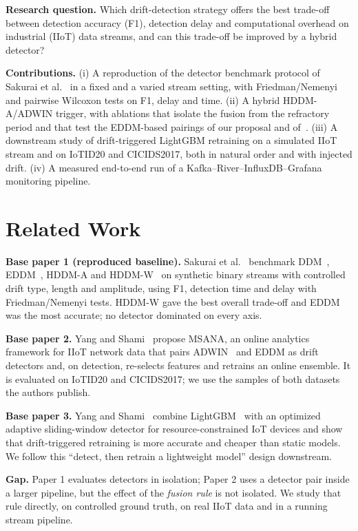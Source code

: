 \documentclass[conference]{IEEEtran}
\begin{document}
\textbf{Research question.} Which drift-detection strategy offers the best trade-off between detection accuracy (F1), detection delay and computational overhead on industrial (IIoT) data streams, and can this trade-off be improved by a hybrid detector?

\textbf{Contributions.} (i) A reproduction of the detector benchmark protocol of Sakurai et al.~\cite{sakurai2023} in a fixed and a varied stream setting, with Friedman/Nemenyi and pairwise Wilcoxon tests on F1, delay and time. (ii) A hybrid HDDM-A/ADWIN trigger, with ablations that isolate the fusion from the refractory period and that test the EDDM-based pairings of our proposal and of~\cite{yang2023msana}. (iii) A downstream study of drift-triggered LightGBM retraining on a simulated IIoT stream and on IoTID20 and CICIDS2017, both in natural order and with injected drift. (iv) A measured end-to-end run of a Kafka--River--InfluxDB--Grafana monitoring pipeline.

\section{Related Work}
\textbf{Base paper 1 (reproduced baseline).} Sakurai et al.~\cite{sakurai2023} benchmark DDM~\cite{gama2004}, EDDM~\cite{baena2006}, HDDM-A and HDDM-W~\cite{frias2015} on synthetic binary streams with controlled drift type, length and amplitude, using F1, detection time and delay with Friedman/Nemenyi tests. HDDM-W gave the best overall trade-off and EDDM was the most accurate; no detector dominated on every axis.

\textbf{Base paper 2.} Yang and Shami~\cite{yang2023msana} propose MSANA, an online analytics framework for IIoT network data that pairs ADWIN~\cite{bifet2007} and EDDM as drift detectors and, on detection, re-selects features and retrains an online ensemble. It is evaluated on IoTID20 and CICIDS2017; we use the samples of both datasets the authors publish.

\textbf{Base paper 3.} Yang and Shami~\cite{yang2021lightweight} combine LightGBM~\cite{ke2017} with an optimized adaptive sliding-window detector for resource-constrained IoT devices and show that drift-triggered retraining is more accurate and cheaper than static models. We follow this ``detect, then retrain a lightweight model'' design downstream.

\textbf{Gap.} Paper 1 evaluates detectors in isolation; Paper 2 uses a detector pair inside a larger pipeline, but the effect of the \emph{fusion rule} is not isolated. We study that rule directly, on controlled ground truth, on real IIoT data and in a running stream pipeline.
\end{document}
